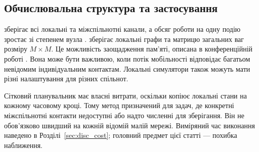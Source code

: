 \subsection{Обчислювальна структура та застосування}
\label{sec:cost}

\Full{} зберігає всі локальні та міжспільнотні канали, а обсяг роботи на одну подію зростає зі степенем вузла \citep{kuryliak2025simulating}. \TS{} зберігає локальні графи та матрицю загальних ваг розміру $M\times M$. Це можливість заощадження пам'яті, описана в конференційній роботі \citep{kuryliak2025towards}. Вона може бути важливою, коли потік мобільності відповідає багатьом невідомим індивідуальним контактам. Локальні симулятори також можуть мати різні налаштування для різних спільнот.

Сітковий планувальник має власні витрати, оскільки копіює локальні стани на кожному часовому кроці. Тому метод призначений для задач, де конкретні міжспільнотні контакти недоступні або надто численні для зберігання. Він не обов'язково швидший на кожній відомій малій мережі. Виміряний час виконання наведено в Розділі~\ref{sec:disc_cost}; головний предмет цієї статті --- похибка наближення.

\clearpage
\endgroup

\clearpage
